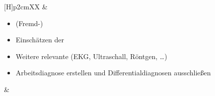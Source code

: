 \begin{table}[H]
\begin{WidePar}
\begin{minipage}[t]{\linewidth -
{2\fboxrule} - {2\fboxsep}}
\begin{minipage}[t]{\linewidth}
{\begin{tabularx}{\linewidth}[H]{p{2cm}XX}
&
\begin{minipage}[t]{\linewidth}
\begin{itemize}
  \item (Fremd-)  
  \item Einschätzen der 
  \item Weitere relevante  (EKG,
  Ultraschall, Röntgen, \ldots)
  \item Arbeitsdiagnose erstellen und Differentialdiagnosen
  ausschließen
\end{itemize}
\end{minipage}
&
\noindent\color{MuwBlueDark}\begin{minipage}[t]{\linewidth}
~
\end{minipage}
\\\addlinespace\bottomrule
\end{tabularx}

\begin{center}


\end{center}}
\end{minipage}
\end{minipage}
\end{WidePar}
\end{table}
